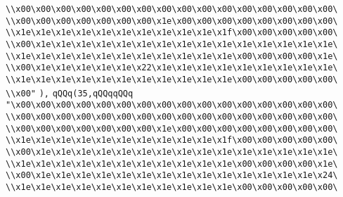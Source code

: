 \verb|\\x00\x00\x00\x00\x00\x00\x00\x00\x00\x00\x00\x00\x00\x00\x00\x00\|\newline
\verb|\\x00\x00\x00\x00\x00\x00\x00\x1e\x00\x00\x00\x00\x00\x00\x00\x00\|\newline
\verb|\\x1e\x1e\x1e\x1e\x1e\x1e\x1e\x1e\x1e\x1e\x1f\x00\x00\x00\x00\x00\|\newline
\verb|\\x00\x1e\x1e\x1e\x1e\x1e\x1e\x1e\x1e\x1e\x1e\x1e\x1e\x1e\x1e\x1e\|\newline
\verb|\\x1e\x1e\x1e\x1e\x1e\x1e\x1e\x1e\x1e\x1e\x1e\x00\x00\x00\x00\x1e\|\newline
\verb|\\x00\x1e\x1e\x1e\x1e\x1e\x22\x1e\x1e\x1e\x1e\x1e\x1e\x1e\x1e\x1e\|\newline
\verb|\\x1e\x1e\x1e\x1e\x1e\x1e\x1e\x1e\x1e\x1e\x1e\x00\x00\x00\x00\x00\|\newline
\verb|\\x00"|\newline
\verb|),|\newline
\verb|qQQq(35,qQQqqQQq|\newline
\verb|"\x00\x00\x00\x00\x00\x00\x00\x00\x00\x00\x00\x00\x00\x00\x00\x00\|\newline
\verb|\\x00\x00\x00\x00\x00\x00\x00\x00\x00\x00\x00\x00\x00\x00\x00\x00\|\newline
\verb|\\x00\x00\x00\x00\x00\x00\x00\x1e\x00\x00\x00\x00\x00\x00\x00\x00\|\newline
\verb|\\x1e\x1e\x1e\x1e\x1e\x1e\x1e\x1e\x1e\x1e\x1f\x00\x00\x00\x00\x00\|\newline
\verb|\\x00\x1e\x1e\x1e\x1e\x1e\x1e\x1e\x1e\x1e\x1e\x1e\x1e\x1e\x1e\x1e\|\newline
\verb|\\x1e\x1e\x1e\x1e\x1e\x1e\x1e\x1e\x1e\x1e\x1e\x00\x00\x00\x00\x1e\|\newline
\verb|\\x00\x1e\x1e\x1e\x1e\x1e\x1e\x1e\x1e\x1e\x1e\x1e\x1e\x1e\x1e\x24\|\newline
\verb|\\x1e\x1e\x1e\x1e\x1e\x1e\x1e\x1e\x1e\x1e\x1e\x00\x00\x00\x00\x00\|\newline
